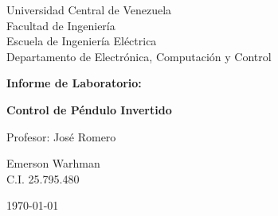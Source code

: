 \begin{titlepage}
    \centering
    \Large
    Universidad Central de Venezuela\\
    Facultad de Ingeniería\\
    Escuela de Ingeniería Eléctrica\\
    Departamento de Electrónica, Computación y Control
    \vspace*{8cm}

    \Huge
    \textbf{Informe de Laboratorio:}

    \textbf{Control de Péndulo Invertido}
    \vfill


    \Large

    \begin{minipage}[t]{0.45\textwidth}
        \flushleft
        Profesor: José Romero
    \end{minipage}
    \hfill
    \begin{minipage}[t]{0.45\textwidth}
        \flushright
        Emerson Warhman \\
        C.I. 25.795.480
    \end{minipage}

    \vspace{0.5cm}

    \today

\end{titlepage}
